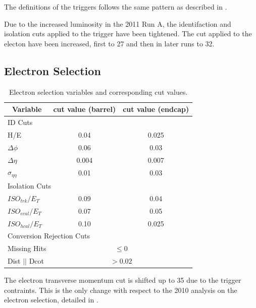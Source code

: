The definitions of the triggers follows the same pattern as described in 
.

Due to the increased luminosity in the 2011 Run A, the identifaction and
isolation cuts applied to the trigger have been tightened. The \PT cut applied
to the electon have been increased, first to \unit{27}{\GeV} and then in later
runs to \unit{32}{\GeV}.

\subsection{Electron Selection}


 \begin{table}[htbp]
   \begin{center}
     \leavevmode
     \begin{tabular}{lcc} 
       \multicolumn{1}{c}{Variable} & \multicolumn{1}{c}{cut value (barrel)}& \multicolumn{1}{c}{cut value (endcap)}\\
         \hline   
 \multicolumn{3}{l}{ID Cuts}\\ 
         H/E & 0.04 & 0.025 \\
         $\Delta\phi$ & 0.06 & 0.03 \\
         $\Delta\eta$ & 0.004 & 0.007  \\
         $\sigma_{\eta\eta}$ & 0.01 & 0.03 \\ \hline
 \multicolumn{3}{l}{Isolation Cuts}\\ 
   $ISO_{trk} / E_T $  & 0.09 & 0.04 \\
   $ISO_{ecal}/ E_T$  & 0.07 & 0.05 \\
   $ISO_{hcal}/ E_T$  & 0.10 & 0.025 \\ \hline
 \multicolumn{3}{l}{Conversion Rejection Cuts}\\ \hline
   Missing Hits  & \multicolumn{2}{c}{$\leq 0$}\\
   Dist $||$ Dcot   & \multicolumn{2}{c}{$>0.02$}\\
     \end{tabular}
     \caption{Electron selection variables and corresponding cut values.}
     \label{asym840:electronselection}
   \end{center}
 \end{table}

The electron transverse momentum cut is shifted up to \unit{35}{\GeV} due to
the trigger contraints. This is the only change with respect to the 2010
analysis on the electron selection, detailed in
.

